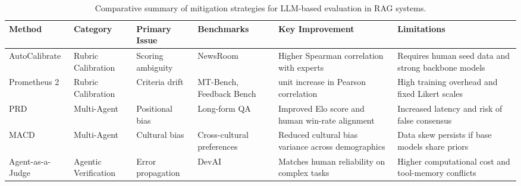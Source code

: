\begin{table}[t]
\centering
\small
\begin{tabularx}{\textwidth}{@{} 
    >{\raggedright\arraybackslash}p{2cm} 
    >{\raggedright\arraybackslash}p{2cm} 
    >{\raggedright\arraybackslash}p{2cm} 
    >{\raggedright\arraybackslash}p{2cm} 
    >{\raggedright\arraybackslash}X 
    >{\raggedright\arraybackslash}X @{}}\toprule
\textbf{Method} & \textbf{Category} & \textbf{Primary Issue} & \textbf{Benchmarks} & \textbf{Key Improvement} & \textbf{Limitations} \\ \midrule

AutoCalibrate \cite{autocalibrate} & Rubric Calibration & Scoring ambiguity & NewsRoom & Higher Spearman correlation with experts & Requires human seed data and strong backbone models \\ \addlinespace

Prometheus 2 \cite{prometheus2} & Rubric Calibration & Criteria drift & MT-Bench, Feedback Bench & 0.2 unit increase in Pearson correlation & High training overhead and fixed Likert scales \\ \addlinespace

PRD \cite{prd} & Multi-Agent & Positional bias & Long-form QA & Improved Elo score and human win-rate alignment & Increased latency and risk of false consensus \\ \addlinespace

MACD \cite{macd} & Multi-Agent & Cultural bias & Cross-cultural preferences & Reduced cultural bias variance across demographics & Data skew persists if base models share priors \\ \addlinespace

Agent-as-a-Judge \cite{agent_judge} & Agentic Verification & Error propagation & DevAI & Matches human reliability on complex tasks & Higher computational cost and tool-memory conflicts \\ 
\bottomrule
\end{tabularx}
\caption{Comparative summary of mitigation strategies for LLM-based evaluation in RAG systems.}
\label{tab:mitigation_summary}
\end{table}